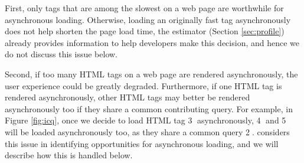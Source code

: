First, only tags that are among the slowest on a web page are worthwhile for 
asynchronous loading. Otherwise, loading an originally fast tag asynchronously does not
help shorten the page load time, the \Tool estimator (Section \ref{sec:profile})
already provides information to help developers make this decision, and hence we do
not discuss this issue below.

Second, if too many HTML tags on a web page
are rendered asynchronously, the user experience could be greatly degraded. 
Furthermore, if one HTML tag is rendered asynchronously, 
other HTML tags may better be rendered asynchronously too if they share a common 
contributing query. For example, in Figure \ref{fig:icq}, once we decide to load HTML tag
{\large \textcircled{\small 3}} asynchronously, {\large \textcircled{\small 4}} and {\large \textcircled{\small 5}} will be loaded asynchronously too,
as they share a common query {\large \textcircled{\small 2}}.
\Tool considers this issue in identifying opportunities
for asynchronous loading, and we will describe how this is handled below.

